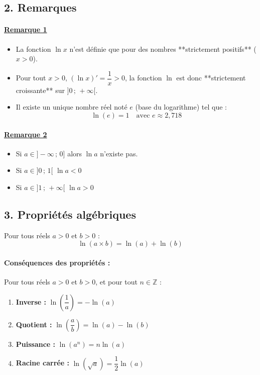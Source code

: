 \documentclass[12pt,a4paper]{article}
\begin{document}
\vspace{0.3cm}

\subsection*{\color{myred}2. Remarques}

\paragraph{\underline{Remarque 1}}
\begin{itemize}
    \item La fonction $\ln x$ n'est définie que pour des nombres **strictement positifs** ($x > 0$).
    \item Pour tout $x > 0$, $(\ln x)' = \dfrac{1}{x} > 0$, la fonction $\ln$ est donc **strictement croissante** sur $]0\,;\,+\infty[$.
    \item Il existe un unique nombre réel noté $e$ (base du logarithme) tel que :
    \[
    \ln(e) = 1 \quad \text{avec } e \approx 2{,}718
    \]
\end{itemize}

\vspace{0.3cm}

\paragraph{\underline{Remarque 2}}
\begin{itemize}
    \item Si $a \in ]-\infty \,;\, 0]$ alors $\ln a$ n'existe pas.
    \item Si $a \in ]0 \,;\, 1[$  $\ln a < 0$
    \item Si $a \in ]1 \,;\, +\infty[$  $\ln a > 0$
\end{itemize}

\subsection*{\color{myred}3. Propriétés algébriques}

\begin{tcolorbox}[colback=red!5!white,colframe=myred,title=\textbf{Propriété fondamentale (Produit)}]
Pour tous réels $a > 0$ et $b > 0$ :
\[
\ln(a \times b) = \ln(a) + \ln(b)
\]
\end{tcolorbox}

\paragraph{Conséquences des propriétés :}
Pour tous réels $a > 0$ et $b > 0$, et pour tout $n \in \mathbb{Z}$ :
\begin{enumerate}[label=\alph*)]
    \item \textbf{Inverse :} $\ln\left(\dfrac{1}{a}\right) = -\ln(a)$
    \item \textbf{Quotient :} $\ln\left(\dfrac{a}{b}\right) = \ln(a) - \ln(b)$
    \item \textbf{Puissance :} $\ln(a^n) = n \ln(a)$
    \item \textbf{Racine carrée :} $\ln(\sqrt{a}) = \dfrac{1}{2}\ln(a)$
\end{enumerate}
\end{document}
